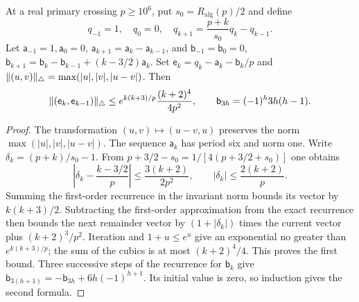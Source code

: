 \begin{lemma}\label{inf:low-recurrence}
At a real primary crossing $p\ge10^6$, put $s_0=R_{\mathrm{alg}}(p)/2$
and define
\[
 q_{-1}=1,\quad q_0=0,\quad
 q_{k+1}=\frac{p+k}{s_0}q_k-q_{k-1}.
\]
Let $\mathsf a_{-1}=1,\mathsf a_0=0$,
$\mathsf a_{k+1}=\mathsf a_k-\mathsf a_{k-1}$, and
$\mathsf b_{-1}=\mathsf b_0=0$,
$\mathsf b_{k+1}=\mathsf b_k-\mathsf b_{k-1}+(k-3/2)\mathsf a_k$.
Set $\mathsf e_k=q_k-\mathsf a_k-\mathsf b_k/p$ and
$\lVert (u,v)\rVert_\triangle=\max(|u|,|v|,|u-v|)$. Then
\begin{equation}\label{inf:low-remainder}
 \lVert (\mathsf e_k,\mathsf e_{k-1})\rVert_\triangle
 \le e^{k(k+3)/p}\frac{(k+2)^4}{4p^2},\qquad
 \mathsf b_{3h}=(-1)^h3h(h-1).
\end{equation}
\end{lemma}
\begin{proof}
The transformation $(u,v)\mapsto(u-v,u)$ preserves the norm
$\max(|u|,|v|,|u-v|)$. The sequence $\mathsf a_k$ has period six and norm one.
Write $\delta_k=(p+k)/s_0-1$. From
$p+3/2-s_0=1/[4(p+3/2+s_0)]$ one obtains
\[
 \left|\delta_k-\frac{k-3/2}p\right|
 \le\frac{3(k+2)}{2p^2},\qquad
 |\delta_k|\le\frac{2(k+2)}p.
\]
Summing the first-order recurrence in the invariant norm bounds its
vector by $k(k+3)/2$. Subtracting the first-order approximation from
the exact recurrence then bounds the next remainder vector by
$(1+|\delta_k|)$ times the current vector plus $(k+2)^3/p^2$.
Iteration and $1+u\le e^u$ give an exponential no greater than
$e^{k(k+3)/p}$; the sum of the cubics is at most $(k+2)^4/4$.
This proves the first bound. Three successive steps of the recurrence
for $\mathsf b_k$ give
$\mathsf b_{3(h+1)}=-\mathsf b_{3h}+6h(-1)^{h+1}$. Its initial value is zero,
so induction gives the second formula.
\end{proof}

